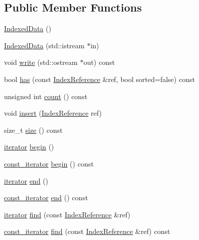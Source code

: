 \subsection*{Public Member Functions}
\begin{DoxyCompactItemize}
\item 
\hyperlink{classIndexedData_a9973db49f518c5e9fdad7985954eb1ea}{Indexed\+Data} ()
\item 
\hyperlink{classIndexedData_aec9e0aea5473b75d0f6829fc2cad3b5b}{Indexed\+Data} (std\+::istream $\ast$in)
\item 
void \hyperlink{classIndexedData_aef2cabec34661920b1ba7b8448775d08}{write} (std\+::ostream $\ast$out) const 
\item 
bool \hyperlink{classIndexedData_ae92cdda206269f83ca4484093c4a7553}{has} (const \hyperlink{classIndexReference}{Index\+Reference} \&ref, bool sorted=false) const 
\item 
unsigned int \hyperlink{classIndexedData_acbb191cebf775273bc94c0a51c9ef2ec}{count} () const 
\item 
void \hyperlink{classIndexedData_a59a7f803269610b024bcd8ea87d2752b}{insert} (\hyperlink{classIndexReference}{Index\+Reference} ref)
\item 
size\+\_\+t \hyperlink{classIndexedData_af88d0d05140d9fb457de89a3f22029b7}{size} () const 
\item 
\hyperlink{classIndexedData_a92375fc0f92911f92908da2251d70fde}{iterator} \hyperlink{classIndexedData_a8ce48c918c26d42a159848b4e8b99290}{begin} ()
\item 
\hyperlink{classIndexedData_a8fb4f6765def0ce366381f0b0aa5c04a}{const\+\_\+iterator} \hyperlink{classIndexedData_a0b68538179655b6c9102888bf49dd066}{begin} () const 
\item 
\hyperlink{classIndexedData_a92375fc0f92911f92908da2251d70fde}{iterator} \hyperlink{classIndexedData_a6278593e0a56312059c5439b0006b145}{end} ()
\item 
\hyperlink{classIndexedData_a8fb4f6765def0ce366381f0b0aa5c04a}{const\+\_\+iterator} \hyperlink{classIndexedData_ad0d4c4eb8604b50f3121a3ae54212792}{end} () const 
\item 
\hyperlink{classIndexedData_a92375fc0f92911f92908da2251d70fde}{iterator} \hyperlink{classIndexedData_afa9e1fb27eaa8a86c311b9971c534504}{find} (const \hyperlink{classIndexReference}{Index\+Reference} \&ref)
\item 
\hyperlink{classIndexedData_a8fb4f6765def0ce366381f0b0aa5c04a}{const\+\_\+iterator} \hyperlink{classIndexedData_a69de178795dc5f698e25f1c04f1cad80}{find} (const \hyperlink{classIndexReference}{Index\+Reference} \&ref) const 

\end{DoxyCompactItemize}
